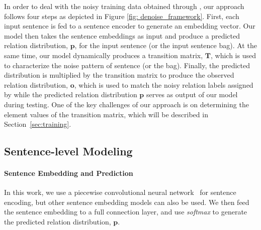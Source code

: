 In order to deal with the noisy training data obtained through \DS, our approach follows four steps as depicted in Figure \ref{fig: denoise_framework}.
First, each input sentence is fed to a sentence encoder to generate an embedding vector. Our model then takes the sentence embeddings as input and produce a predicted relation
distribution, $\mathbf{p}$, for the input sentence (or the input sentence bag). At the same time, our model dynamically produces
a transition matrix, $\mathbf{T}$, which is used to characterize the noise pattern of  %
sentence (or the bag). Finally, the predicted distribution is multiplied by the transition matrix to produce the observed relation
distribution, $\mathbf{o}$, which is used to match the noisy relation labels
assigned by \DS
while the predicted relation distribution $\mathbf{p}$ serves
as output of our model during testing.
One of the key challenges of our approach is on determining the element values of the transition matrix, which will be described in Section~\ref{sec:training}.



\subsection{Sentence-level Modeling}

\paragraph{Sentence Embedding and Prediction}
 In this work, we use a piecewise convolutional neural network~\cite{zeng2015distant} for sentence encoding, but other sentence embedding models can also be used.
We then feed the sentence embedding to a full connection layer, and use \emph{softmax} to generate the predicted relation distribution, $\mathbf{p}$.


